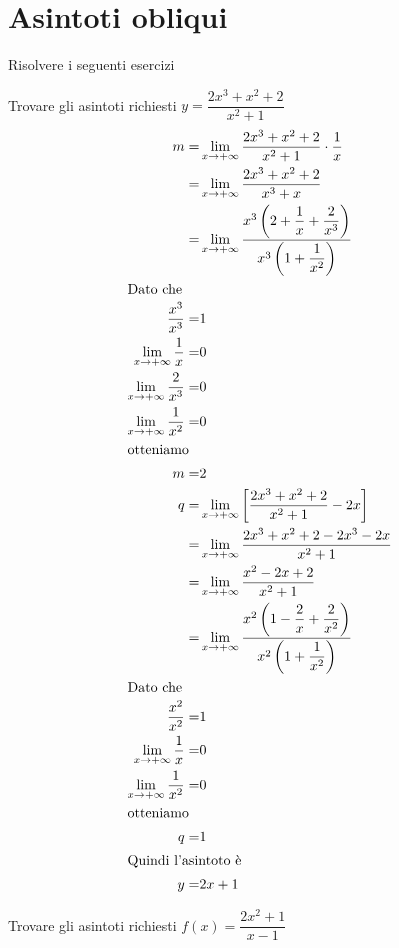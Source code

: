 \section{Asintoti obliqui}
Risolvere i seguenti esercizi
\begin{exercise}
	Trovare gli asintoti richiesti
	$y=\dfrac{2x^3+x^2+2}{x^2+1}$
	\tcblower
	\begin{align*}
	m=&\lim_{x\to +\infty}\dfrac{2x^3+x^2+2}{x^2+1}\cdot\dfrac{1}{x}\\
	=&\lim_{x\to +\infty}\dfrac{2x^3+x^2+2}{x^3+x}\\
	=&\lim_{x\to +\infty}\dfrac{x^3\left(2+\dfrac{1}{x}+\dfrac{2}{x^3}\right)}{x^3\left(1+\dfrac{1}{x^2}\right)}\\
	\intertext{Dato che}
	\dfrac{x^3}{x^3}=&1\\
	\lim_{x\to +\infty}\dfrac{1}{x}=&0\\
	\lim_{x\to +\infty}\dfrac{2}{x^3}=&0\\
	\lim_{x\to +\infty}\dfrac{1}{x^2}=&0\\
	\intertext{otteniamo}
	m=&2\\
	q=&\lim_{x\to +\infty}\left[\dfrac{2x^3+x^2+2}{x^2+1}-2x\right]\\
	=&\lim_{x\to +\infty}\dfrac{2x^3+x^2+2-2x^3-2x}{x^2+1}\\
	=&\lim_{x\to +\infty}\dfrac{x^2-2x+2}{x^2+1}\\
	=&\lim_{x\to +\infty}\dfrac{x^2\left(1-\dfrac{2}{x}+\dfrac{2}{x^2}\right)}{x^2\left(1+\dfrac{1}{x^2}\right)}\\
	\intertext{Dato che}
	\dfrac{x^2}{x^2}=&1\\
	\lim_{x\to +\infty}\dfrac{1}{x}=&0\\
	\lim_{x\to +\infty}\dfrac{1}{x^2}=&0\\
	\intertext{otteniamo}
	q=&1\\
	\intertext{Quindi l'asintoto è}
	y=&2x+1
	\end{align*}
\end{exercise}
\begin{exercise}[no solution]
	Trovare gli asintoti richiesti $f(x)= \dfrac{2x^2+1}{x-1}$
\end{exercise}
